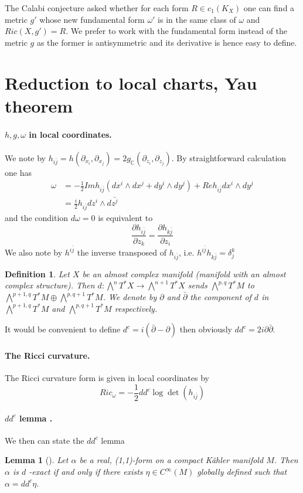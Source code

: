 \documentclass[11pt]{article}
\newtheorem{lemma}[theorem]{Lemma}
\newtheorem{definition}{Definition}
\begin{document}
The Calabi conjecture asked whether for each form \(R\in c_1(K_X)\) one can find a metric \(g'\) whose
new fundamental form \(\omega'\) is in the same class of \(\omega\) and \(Ric(X,g') = R\). We prefer to
work with the fundamental form instead of the metric \(g\) as the former is antisymmetric and its
derivative is hence easy to define.

\section{Reduction to local charts, Yau theorem}
\label{sec:org8610ea0}
\paragraph{\(h,g,\omega\) in local coordinates.}
\label{sec:orge9718d4}
We note by \(h_{i\bar j} = h(\partial_{x_i},\partial_{x_j}) =
2g_{\mathbb{C}}(\partial_{z_i},\partial_{z_j})\). By straightforward calculation one has
\begin{align*}
\omega & = -\frac{1}{2} Im h_{i\bar j} (dx^i\wedge dx^j + dy^i\wedge dy^j) + Re h_{i\bar j}dx^i\wedge dy^j\\
& = \frac{i}{2}h_{i\bar j}dz^i\wedge d\bar{z^j}
\end{align*}
and the condition \(d\omega = 0\) is equivalent to
\[
\frac{\partial h_{i\bar j}}{\partial z_k} = \frac{\partial h_{k\bar j}}{\partial z_i}
\]
We also note by \(h^{i\bar j}\) the inverse transposed of \(h_{i\bar j}\), i.e. \(h^{i\bar j}h_{k\bar j}
= \delta_j^k\)
\begin{definition}
Let \(X\) be an almost complex manifold (manifold with an almost complex structure). Then
\(d:\bigwedge^nT^*X\longrightarrow \bigwedge^{n+1}T^*X\) sends \(\bigwedge^{p,q}T^*M\) to
\(\bigwedge^{p+1,q}T^*M\oplus \bigwedge^{p,q+1}T^*M\). We denote by \(\partial\) and \(\bar\partial\) the
component of \(d\) in \(\bigwedge^{p+1,q}T^*M\) and \(\bigwedge^{p,q+1}T^*M\) respectively. 
\end{definition}
It would be convenient to define \(d^c =i(\bar\partial - \partial)\) then obviously \(dd^c =
2i\partial\bar\partial\). 


\paragraph{The Ricci curvature.}
\label{sec:org1fb4de0}
The Ricci curvature form is given in local coordinates by
\[
Ric_{\omega} = -\frac{1}{2}dd^c\log\det(h_{i\bar j})
\]


\paragraph{\(dd^c\) lemma .}
\label{sec:orgb24648c}
We then can state the \(dd^c\) lemma
\begin{lemma}[]
Let \(\alpha\) be a real, (1,1)-form on a compact Kähler manifold \(M\). Then \(\alpha\) is \(d\) -exact if
and only if there exists \(\eta\in C^\infty(M)\) globally defined such that \(\alpha = dd^c\eta\).
\end{lemma}
\end{document}
